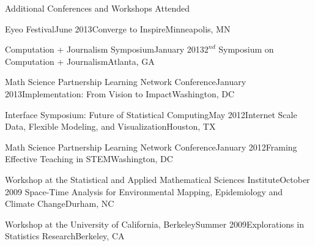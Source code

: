 \documentclass{resume} %
\begin{document}
\begin{rSection}{Additional Conferences and Workshops Attended}

\begin{sSubsection}{Eyeo Festival}{}{June 2013}{Converge to Inspire}{Minneapolis, MN}
\end{sSubsection}

\begin{sSubsection}{Computation + Journalism Symposium}{}{January 2013}{$2^{nd}$ Symposium on Computation + Journalism}{Atlanta, GA}
\end{sSubsection}

\begin{sSubsection}{Math Science Partnership Learning Network Conference}{}{January 2013}{Implementation: From Vision to Impact}{Washington, DC}
\end{sSubsection}

\begin{sSubsection}{Interface Symposium: Future of Statistical Computing}{}{May 2012}{Internet Scale Data, Flexible Modeling, and Visualization}{Houston, TX}
\end{sSubsection}

\begin{sSubsection}{Math Science Partnership Learning Network Conference}{}{January 2012}{Framing Effective Teaching in STEM}{Washington, DC}
\end{sSubsection}

\begin{sSubsection}{Workshop at the Statistical and Applied Mathematical Sciences Institute}{}{October 2009}{ Space-Time Analysis for Environmental Mapping, Epidemiology and Climate Change}{Durham, NC}
\end{sSubsection}

\begin{sSubsection}{Workshop at the University of California, Berkeley}{}{Summer 2009}{Explorations in Statistics Research}{Berkeley, CA}
\end{sSubsection}
\end{rSection}
\end{document}
